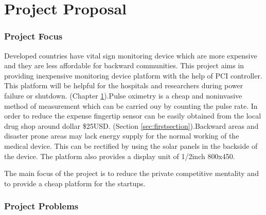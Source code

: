 
\chapter{Project Proposal}\label{chapter:firstchapter} %

\label{ChapterX} %







\subsection{Project Focus}


Developed countries have vital sign monitoring device which are more expensive and they are less affordable for backward communities. This project aims in providing inexpensive monitoring device platform with the help of PCI controller. This platform will be helpful for the hospitals and researchers during power failure or shutdown. (Chapter \ref{chapter:firstchapter}).Pulse oximetry is a cheap and noninvasive method of measurement which can be carried ouy by counting the pulse rate. In order to reduce the expense fingertip sensor can be easily obtained from the local drug shop around dollar \$25USD. (Section \ref{sec:firstsection}).Backward areas and disaster prone areas may lack energy supply for the normal working of the medical device. This can be rectified by using the solar panels in the backside of the device. The platform also provides a display unit of 1/2inch 800x450.

The main focus of the project is to reduce the private competitive mentality and to provide a cheap platform for the startups.
 


\subsection{Project Problems}

